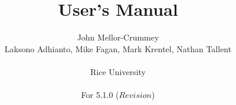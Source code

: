 \documentclass[11pt,letterpaper]{report}
\begin{document}

\title{\HPCToolkit{} User's Manual}

\author{
John Mellor-Crummey\\
Laksono Adhianto,
Mike Fagan,
Mark Krentel,
Nathan Tallent\\
\\
Rice University\\
\\
For \HPCToolkit{} 5.1.0 ($Revision$)
}


\maketitle



\setcounter{page}{1}







\begin{singlespace}

\newpage

\pagestyle{empty}
\thispagestyle{empty}
\tableofcontents



\end{singlespace}
\end{document}
